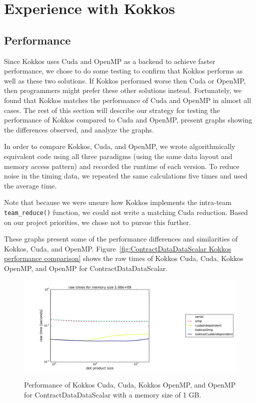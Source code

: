 \chapter{Experience with Kokkos}
\section{Performance}
Since Kokkos uses Cuda and OpenMP as a backend to achieve faster performance, we
chose to do some testing to confirm that Kokkos performs as well as these two
solutions. If Kokkos performed worse then Cuda or OpenMP, then programmers might
prefer these other solutions instead.  Fortunately, we found that Kokkos matches
the performance of Cuda and OpenMP in almost all cases.  The rest of this
section will describe our strategy for testing the performance of Kokkos
compared to Cuda and OpenMP, present graphs showing the differences observed,
and analyze the graphs.

In order to compare Kokkos, Cuda, and OpenMP, we wrote algorithmically
equivalent code using all three paradigms (using the same data layout and memory
access pattern) and recorded the runtime of each version.  To reduce noise in
the timing data, we repeated the same calculations five times and used the
average time.

Note that because we were unsure how Kokkos implements the intra-team \texttt{team\_reduce()}
function, we could not write a matching Cuda reduction.  Based on our project
priorities, we chose not to pursue this further.

These graphs present some of the performance differences and similarities of
Kokkos, Cuda, and OpenMP. Figure~\ref{fig:ContractDataDataScalar Kokkos
performance comparison} shows the raw times of Kokkos Cuda, Cuda, Kokkos OpenMP,
and OpenMP for ContractDataDataScalar.

\begin{figure}[!ht]
{\includegraphics[scale=.4]{CDDS_RawTimes_2d_largestSize_Comparison.pdf}}
\caption[ContractDataDataScalar Kokkos performance comparison]{
    Performance of Kokkos Cuda, Cuda, Kokkos OpenMP,
and OpenMP for ContractDataDataScalar with a memory size of 1 GB.}
\label{fig:ContractDataDataScalar Kokkos performance comparison}
\end{figure}

